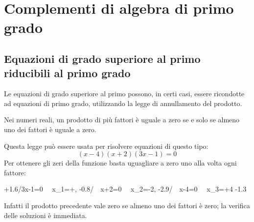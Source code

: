 


\chapter{Complementi di algebra di primo grado}

\section{Equazioni di grado superiore al primo riducibili al primo grado}
\label{sec:compl1_eqgradosup}

Le equazioni di grado superiore al primo possono, in certi casi, essere 
ricondotte ad equazioni di primo grado, utilizzando la legge di annullamento 
del prodotto.

\begin{definizione}
 Nei numeri reali, un prodotto di più fattori è uguale a zero se e solo se 
 almeno uno dei fattori è uguale a zero.
\end{definizione}

Questa legge può essere usata per risolvere equazioni di questo tipo:
\[(x-4)(x+2)(3x-1)=0\]
Per ottenere gli zeri della funzione basta uguagliare a zero uno alla volta 
ogni fattore:
\begin{center} 
                 {+1.6/{3x-1=0~ \sRarrow ~x_1=+},
                  -0.8/{~~x+2=0~ \sRarrow ~x_2=-2},
                  -2.9/{~~x-4=0~ \sRarrow ~x_3=+4}}
                 {-1.3}
\end{center} 
Infatti il prodotto precedente vale zero se almeno uno dei fattori è zero; 
la verifica delle soluzioni è immediata.


